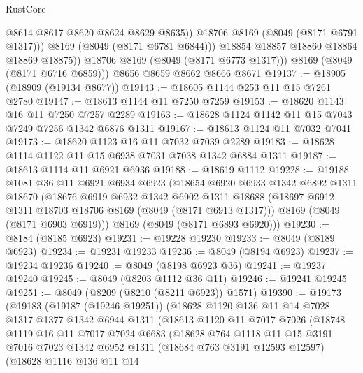 \begin{lexlean}{RustCore}
\begin{coremodule}
                    @8614
                    @8617
                    @8620
                    @8624
                    @8629
                    @8635))
                @18706
                @8169
                (@8049 (@8171 @6791 @1317)))
              @8169
              (@8049 (@8171 @6781 @6844)))
            @18854
            @18857
            @18860
            @18864
            @18869
            @18875))
        @18706
        @8169
        (@8049 (@8171 @6773 @1317)))
      @8169
      (@8049 (@8171 @6716 @6859)))
    @8656
    @8659
    @8662
    @8666
    @8671
@19137 := @18905 (@18909 (@19134 @8677))
@19143 := @18605 @1144 @253 @11 @15 @7261 @2780
@19147 := @18613 @1144 @11 @7250 @7259
@19153 := @18620 @1143 @16 @11 @7250 @7257 @2289
@19163 := @18628 @1124 @1142 @11 @15 @7043 @7249 @7256 @1342 @6876 @1311
@19167 := @18613 @1124 @11 @7032 @7041
@19173 := @18620 @1123 @16 @11 @7032 @7039 @2289
@19183 := @18628 @1114 @1122 @11 @15 @6938 @7031 @7038 @1342 @6884 @1311
@19187 := @18613 @1114 @11 @6921 @6936
@19188 := @18619 @1112
@19228 := @19188
    @1081
    @36
    @11
    @6921
    @6934
    @6923
    (@18654
      @6920
      @6933
      @1342
      @6892
      @1311
      @18670
      (@18676
        @6919
        @6932
        @1342
        @6902
        @1311
        @18688
        (@18697 @6912 @1311 @18703 @18706 @8169 (@8049 (@8171 @6913 @1317)))
        @8169
        (@8049 (@8171 @6903 @6919)))
      @8169
      (@8049 (@8171 @6893 @6920)))
@19230 := @8184 (@8185 @6923)
@19231 := @19228 @19230
@19233 := @8049 (@8189 @6923)
@19234 := @19231 @19233
@19236 := @8049 (@8194 @6923)
@19237 := @19234 @19236
@19240 := @8049 (@8198 @6923 @36)
@19241 := @19237 @19240
@19245 := @8049 (@8203 @1112 @36 @11)
@19246 := @19241 @19245
@19251 := @8049 (@8209 (@8210 (@8211 @6923)) @1571)
@19390 := @19173
    (@19183
      (@19187 (@19246 @19251))
      (@18628
        @1120
        @136
        @11
        @14
        @7028
        @1317
        @1377
        @1342
        @6944
        @1311
        (@18613
          @1120
          @11
          @7017
          @7026
          (@18748
            @1119
            @16
            @11
            @7017
            @7024
            @6683
            (@18628
              @764
              @1118
              @11
              @15
              @3191
              @7016
              @7023
              @1342
              @6952
              @1311
              (@18684 @763 @3191 @12593 @12597)
              (@18628
                @1116
                @136
                @11
                @14

\end{coremodule}
\end{lexlean}
